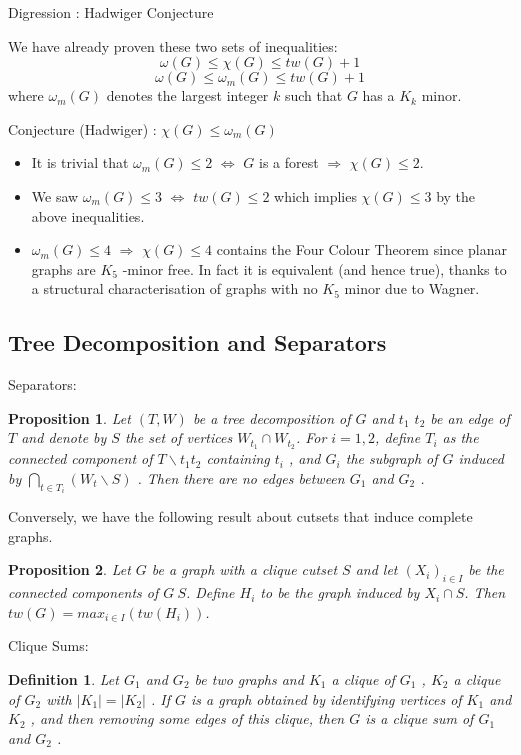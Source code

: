 \documentclass[12pt,a4paper]{article}
\newtheorem{prop}{Proposition}
\newtheorem{definition}{Definition}
\begin{document}
Digression : Hadwiger Conjecture

We have already proven these two sets of inequalities: 
$$ \omega( G ) \leq \chi( G ) \leq tw( G ) + 1$$
$$ \omega( G ) \leq \omega_m ( G ) \leq tw( G ) + 1$$
where $\omega_m ( G )$ denotes the largest integer $k$ such that $G$ has a $K_k$ minor.

Conjecture (Hadwiger) : $\chi( G ) \leq \omega_m ( G )$\\
\begin{itemize}
\item It is trivial that $\omega_m ( G ) \leq 2$ $\Leftrightarrow$ $G$ is a forest $\Rightarrow$ $\chi( G ) \leq 2$.
\item We saw $\omega_m ( G ) \leq 3$ $\Leftrightarrow$ $tw( G ) \leq 2$ which implies $\chi( G ) \leq 3$ by the above
inequalities.
\item $\omega_m ( G ) \leq 4$ $\Rightarrow$ $\chi( G ) \leq 4$ contains the Four Colour Theorem since planar
graphs are $K_5$ -minor free. In fact it is equivalent (and hence true), thanks to a
structural characterisation of graphs with no $K_5$ minor due to Wagner.
\end{itemize}


\subsection{Tree Decomposition and Separators}
Separators:

\begin{prop}
Let $( T , W )$ be a tree decomposition of $G$ and $t_1$ $t_2$ be an edge of $T$ and denote by
$S$ the set of vertices $W_{t_1} \cap W_{t_2}$. For $i = 1 , 2$, define $T_i$ as the connected component
of $T \backslash t_1 t_2$ containing $t_i$ , and $G_i$ the subgraph of $G$ induced by $\bigcap_{t \in T_i} ( W_t \backslash S )$ . Then
there are no edges between $G_1$ and $G_2$ .
\end{prop}

Conversely, we have the following result about cutsets that induce complete
graphs.

\begin{prop}
Let $G$ be a graph with a clique cutset $S$ and let $( X_i )_{i \in I}$ be the connected
components of $G \ S$. Define $H_i$ to be the graph induced by $X_i \cap S$. Then
$tw( G ) = max_{i \in I} (tw( H_i ))$.
\end{prop}

Clique Sums:

\begin{definition}
Let $G_1$ and $G_2$ be two graphs and $K_1$ a clique of $G_1$ , $K_2$ a clique of $G_2$ with
$| K_1 | = | K_2 |$ . If $G$ is a graph obtained by identifying vertices of $K_1$ and $K_2$ , and then
removing some edges of this clique, then $G$ is a clique sum of $G_1$ and $G_2$ .
\end{definition}
\end{document}
